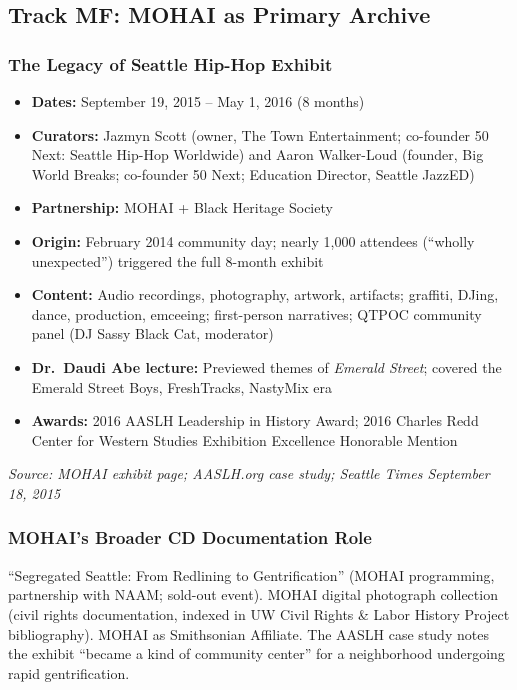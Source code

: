 \documentclass[11pt,letterpaper]{article}
\begin{document}
\subsection{Track MF: MOHAI as Primary Archive}

\subsubsection{The Legacy of Seattle Hip-Hop Exhibit}

\begin{itemize}
\item \textbf{Dates:} September 19, 2015 -- May 1, 2016 (8 months)
\item \textbf{Curators:} Jazmyn Scott (owner, The Town Entertainment; co-founder 50 Next: Seattle
   Hip-Hop Worldwide) and Aaron Walker-Loud (founder, Big World Breaks; co-founder 50 Next;
   Education Director, Seattle JazzED)
\item \textbf{Partnership:} MOHAI + Black Heritage Society
\item \textbf{Origin:} February 2014 community day; nearly 1,000 attendees (``wholly unexpected'')
   triggered the full 8-month exhibit
\item \textbf{Content:} Audio recordings, photography, artwork, artifacts; graffiti, DJing, dance,
   production, emceeing; first-person narratives; QTPOC community panel (DJ Sassy Black Cat, moderator)
\item \textbf{Dr.\ Daudi Abe lecture:} Previewed themes of \textit{Emerald Street}; covered the
   Emerald Street Boys, FreshTracks, NastyMix era
\item \textbf{Awards:} 2016 AASLH Leadership in History Award; 2016 Charles Redd Center for
   Western Studies Exhibition Excellence Honorable Mention
\end{itemize}

\textit{Source: MOHAI exhibit page; AASLH.org case study; Seattle Times September 18, 2015}

\subsubsection{MOHAI's Broader CD Documentation Role}

``Segregated Seattle: From Redlining to Gentrification'' (MOHAI programming, partnership with
NAAM; sold-out event). MOHAI digital photograph collection (civil rights documentation, indexed in
UW Civil Rights \& Labor History Project bibliography). MOHAI as Smithsonian Affiliate. The AASLH
case study notes the exhibit ``became a kind of community center'' for a neighborhood undergoing
rapid gentrification.
\end{document}
